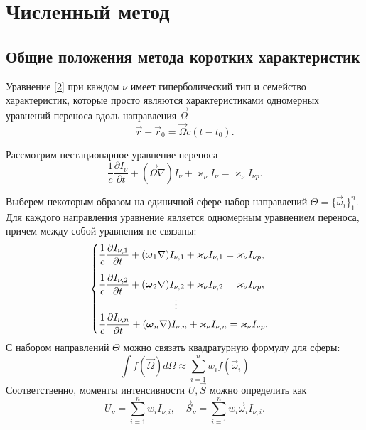\chapter{Численный метод}

\section{Общие положения метода коротких характеристик}
Уравнение \eqref{2} при каждом $\nu$ имеет гиперболический тип и семейство характеристик, которые просто являются характеристиками одномерных уравнений переноса вдоль направления $\vec\Omega$ 
\begin {equation}
\vec r - \vec r_0 = \vec \Omega c(t-t_0).
\end {equation}

Рассмотрим нестационарное уравнение переноса
\begin {equation}
\frac{1}{c}\frac{\partial I_{\nu}}{\partial t} + (\vec\Omega \nabla) I_{\nu} + \varkappa_\nu I_\nu = \varkappa_{\nu} I_{\nu p}.
\end {equation}

Выберем некоторым образом на единичной сфере набор направлений $\Theta = \{\vec\omega_i\}_1^n$. Для каждого направления уравнение является одномерным уравнением переноса, причем между собой уравнения не связаны:
\begin {equation}
\begin {cases}
\dfrac{1}{c} \dfrac{\partial I_{\nu,1}}{\partial t} + (\vec\omega_1 \nabla) I_{\nu,1} + \varkappa_\nu I_{\nu,1} = \varkappa_{\nu} I_{\nu p}, \\[12pt]
\dfrac{1}{c} \dfrac{\partial I_{\nu,2}}{\partial t} + (\vec\omega_2 \nabla) I_{\nu,2} + \varkappa_\nu I_{\nu,2} = \varkappa_{\nu} I_{\nu p},\\
\hspace{7,65em}\vdots \\
\dfrac{1}{c} \dfrac{\partial I_{\nu,n}}{\partial t} + (\vec\omega_n \nabla) I_{\nu,n} + \varkappa_\nu I_{\nu,n} = \varkappa_{\nu} I_{\nu p}.
\label {9}
\end {cases}
\end {equation}
С набором направлений $\Theta$ можно связать квадратурную формулу для сферы:
\begin {equation}
\int f(\vec\Omega)d\Omega \approx \sum_{i=1}^n w_i f(\vec \omega_i)
\end {equation}
Соответственно, моменты интенсивности $U, \vec S$ можно определить как
\begin {equation}
U_\nu = \sum_{i=1}^n w_i I_{\nu,i}, \quad
\vec S_\nu = \sum_{i=1}^n w_i \vec \omega_i I_{\nu,i}.
\end {equation}

